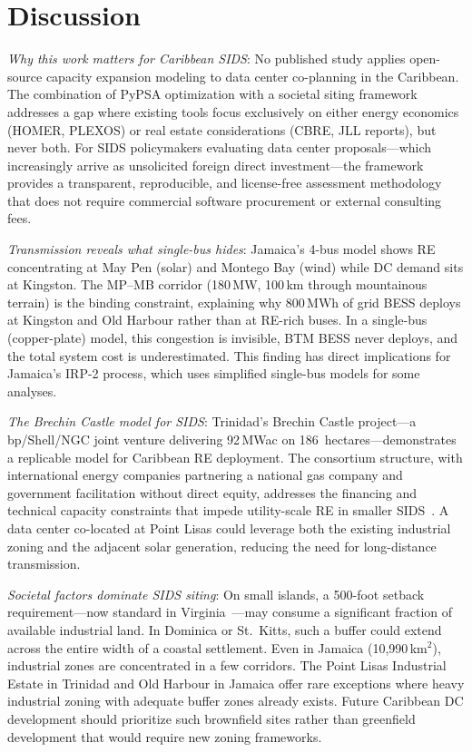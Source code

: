 \documentclass[conference,10pt]{IEEEtran}
\begin{document}
\section{Discussion}

\textit{Why this work matters for Caribbean SIDS}: No published study applies open-source capacity expansion modeling to data center co-planning in the Caribbean. The combination of PyPSA optimization with a societal siting framework addresses a gap where existing tools focus exclusively on either energy economics (HOMER, PLEXOS) or real estate considerations (CBRE, JLL reports), but never both. For SIDS policymakers evaluating data center proposals---which increasingly arrive as unsolicited foreign direct investment---the framework provides a transparent, reproducible, and license-free assessment methodology that does not require commercial software procurement or external consulting fees.

\textit{Transmission reveals what single-bus hides}: Jamaica's 4-bus model shows RE concentrating at May Pen (solar) and Montego Bay (wind) while DC demand sits at Kingston. The MP--MB corridor (180\,MW, 100\,km through mountainous terrain) is the binding constraint, explaining why 800\,MWh of grid BESS deploys at Kingston and Old Harbour rather than at RE-rich buses. In a single-bus (copper-plate) model, this congestion is invisible, BTM BESS never deploys, and the total system cost is underestimated. This finding has direct implications for Jamaica's IRP-2 process, which uses simplified single-bus models for some analyses.

\textit{The Brechin Castle model for SIDS}: Trinidad's Brechin Castle project---a bp/Shell/NGC joint venture delivering 92\,MWac on 186~hectares---demonstrates a replicable model for Caribbean RE deployment. The consortium structure, with international energy companies partnering a national gas company and government facilitation without direct equity, addresses the financing and technical capacity constraints that impede utility-scale RE in smaller SIDS~\cite{brechin_ecp}. A data center co-located at Point Lisas could leverage both the existing industrial zoning and the adjacent solar generation, reducing the need for long-distance transmission.

\textit{Societal factors dominate SIDS siting}: On small islands, a 500-foot setback requirement---now standard in Virginia~\cite{stafford2025}---may consume a significant fraction of available industrial land. In Dominica or St.~Kitts, such a buffer could extend across the entire width of a coastal settlement. Even in Jamaica (10{,}990\,km$^2$), industrial zones are concentrated in a few corridors. The Point Lisas Industrial Estate in Trinidad and Old Harbour in Jamaica offer rare exceptions where heavy industrial zoning with adequate buffer zones already exists. Future Caribbean DC development should prioritize such brownfield sites rather than greenfield development that would require new zoning frameworks.
\end{document}
